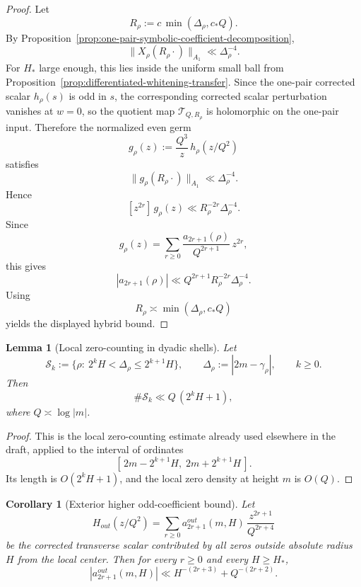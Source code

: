 \documentclass[11pt,a4paper]{amsart}
\def\out{out}%
\theoremstyle{plain}
\newtheorem{lemma}[theorem]{Lemma}
\newtheorem{corollary}[theorem]{Corollary}
\theoremstyle{definition}
\newcommand{\out}{\mathrm{out}}
\begin{document}
\begin{proof}
Let
\[
R_\rho:=c\,\min(\Delta_\rho,c_*Q).
\]
By Proposition~\ref{prop:one-pair-symbolic-coefficient-decomposition},
\[
\|X_\rho(R_\rho\cdot)\|_{A_1}\ll \Delta_\rho^{-4}.
\]
For $H_*$ large enough, this lies inside the uniform small ball from
Proposition~\ref{prop:differentiated-whitening-transfer}. Since the one-pair
corrected scalar $h_\rho(s)$ is odd in $s$, the corresponding corrected
scalar perturbation vanishes at $w=0$, so the quotient map
$\mathcal T_{Q,R_\rho}$ is holomorphic on the one-pair input. Therefore the
normalized even germ
\[
g_\rho(z):=\frac{Q^3}{z}\,h_\rho(z/Q^2)
\]
satisfies
\[
\|g_\rho(R_\rho\cdot)\|_{A_1}\ll \Delta_\rho^{-4}.
\]
Hence
\[
[z^{2r}]\,g_\rho(z)\ll R_\rho^{-2r}\Delta_\rho^{-4}.
\]
Since
\[
g_\rho(z)=\sum_{r\ge 0}\frac{a_{2r+1}(\rho)}{Q^{2r+1}}\,z^{2r},
\]
this gives
\[
|a_{2r+1}(\rho)|\ll Q^{2r+1}R_\rho^{-2r}\Delta_\rho^{-4}.
\]
Using
\[
R_\rho\asymp \min(\Delta_\rho,c_*Q)
\]
yields the displayed hybrid bound.
\end{proof}

\begin{lemma}[Local zero-counting in dyadic shells]
\label{lem:dyadic-shell-count}
Let
\[
\mathcal S_k:=\{\rho:\ 2^kH<\Delta_\rho\le 2^{k+1}H\},
\qquad
\Delta_\rho:=|2m-\gamma_\rho|,
\qquad
k\ge 0.
\]
Then
\[
\#\mathcal S_k\ll Q\,(2^kH+1),
\]
where $Q\asymp \log|m|$.
\end{lemma}

\begin{proof}
This is the local zero-counting estimate already used elsewhere in the draft,
applied to the interval of ordinates
\[
[\,2m-2^{k+1}H,\;2m+2^{k+1}H\,].
\]
Its length is $O(2^kH+1)$, and the local zero density at height $m$ is
$O(Q)$.
\end{proof}

\begin{corollary}[Exterior higher odd-coefficient bound]
\label{cor:outside-higher-odd-jets}
Let
\[
H_{\out}(z/Q^2)
=
\sum_{r\ge 0} a_{2r+1}^{\out}(m,H)\,\frac{z^{2r+1}}{Q^{2r+4}}
\]
be the corrected transverse scalar contributed by all zeros outside absolute
radius $H$ from the local center. Then for every $r\ge 0$ and every
$H\ge H_*$,
\[
\boxed{
|a_{2r+1}^{\out}(m,H)|
\ll
H^{-(2r+3)}+Q^{-(2r+2)}.
}
\]
\end{corollary}
\end{document}

